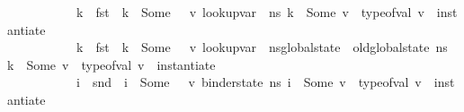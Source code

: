 \begin{isabellebody}
\ \ \ \ \ \ \ \ \ \ {\isachardoublequoteopen}{\isasymforall}\ k\ {\isasymtau}{\isacharprime}{\kern0pt}{\isachardot}{\kern0pt}\ {\isacharparenleft}{\kern0pt}{\isacharparenleft}{\kern0pt}fst\ {\isasymDelta}{\isacharparenright}{\kern0pt}\ k\ {\isacharequal}{\kern0pt}\ Some\ {\isasymtau}{\isacharprime}{\kern0pt}{\isacharparenright}{\kern0pt}\ {\isasymlongrightarrow}\ {\isacharparenleft}{\kern0pt}{\isasymexists}v{\isachardot}{\kern0pt}\ {\isacharparenleft}{\kern0pt}lookup{\isacharunderscore}{\kern0pt}var\ {\isasymLambda}\ n{\isacharunderscore}{\kern0pt}s\ k\ {\isacharequal}{\kern0pt}\ Some\ v{\isacharparenright}{\kern0pt}\ {\isasymand}\ type{\isacharunderscore}{\kern0pt}of{\isacharunderscore}{\kern0pt}val\ v\ {\isacharequal}{\kern0pt}\ instantiate\ {\isasymOmega}\ {\isasymtau}{\isacharprime}{\kern0pt}{\isacharparenright}{\kern0pt}{\isachardoublequoteclose}\isanewline
\ \ \ \ \ \ \ \ \ \ {\isachardoublequoteopen}{\isasymforall}\ k\ {\isasymtau}{\isacharprime}{\kern0pt}{\isachardot}{\kern0pt}\ {\isacharparenleft}{\kern0pt}{\isacharparenleft}{\kern0pt}fst\ {\isasymDelta}{\isacharparenright}{\kern0pt}\ k\ {\isacharequal}{\kern0pt}\ Some\ {\isasymtau}{\isacharprime}{\kern0pt}{\isacharparenright}{\kern0pt}\ {\isasymlongrightarrow}\ {\isacharparenleft}{\kern0pt}{\isasymexists}v{\isachardot}{\kern0pt}\ {\isacharparenleft}{\kern0pt}lookup{\isacharunderscore}{\kern0pt}var\ {\isasymLambda}\ {\isacharparenleft}{\kern0pt}n{\isacharunderscore}{\kern0pt}s{\isasymlparr}global{\isacharunderscore}{\kern0pt}state\ {\isacharcolon}{\kern0pt}{\isacharequal}{\kern0pt}\ old{\isacharunderscore}{\kern0pt}global{\isacharunderscore}{\kern0pt}state\ n{\isacharunderscore}{\kern0pt}s{\isasymrparr}{\isacharparenright}{\kern0pt}\ k\ {\isacharequal}{\kern0pt}\ Some\ v{\isacharparenright}{\kern0pt}\ {\isasymand}\ type{\isacharunderscore}{\kern0pt}of{\isacharunderscore}{\kern0pt}val\ v\ {\isacharequal}{\kern0pt}\ instantiate\ {\isasymOmega}\ {\isasymtau}{\isacharprime}{\kern0pt}{\isacharparenright}{\kern0pt}{\isachardoublequoteclose}\ \isanewline
\ \ \ \ \ \ \ \ \ \ {\isachardoublequoteopen}{\isasymforall}\ i\ {\isasymtau}{\isacharprime}{\kern0pt}{\isachardot}{\kern0pt}\ {\isacharparenleft}{\kern0pt}{\isacharparenleft}{\kern0pt}snd\ {\isasymDelta}{\isacharparenright}{\kern0pt}\ i\ {\isacharequal}{\kern0pt}\ Some\ {\isasymtau}{\isacharprime}{\kern0pt}{\isacharparenright}{\kern0pt}\ {\isasymlongrightarrow}\ {\isacharparenleft}{\kern0pt}{\isasymexists}v{\isachardot}{\kern0pt}\ binder{\isacharunderscore}{\kern0pt}state\ n{\isacharunderscore}{\kern0pt}s\ i\ {\isacharequal}{\kern0pt}\ Some\ v\ {\isasymand}\ type{\isacharunderscore}{\kern0pt}of{\isacharunderscore}{\kern0pt}val\ v\ {\isacharequal}{\kern0pt}\ instantiate\ {\isasymOmega}\ {\isasymtau}{\isacharprime}{\kern0pt}{\isacharparenright}{\kern0pt}{\isachardoublequoteclose}\ \ \ \ \ \ \ \ \ \ \ \isanewline

\end{isabellebody}

